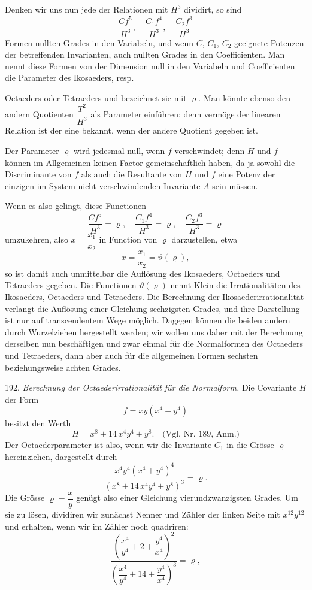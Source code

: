 \documentclass[11pt]{article}
\providecommand{\weberpage}[1]{}
\begin{document}
Denken wir uns nun jede der Relationen mit $H^3$ dividirt, so sind
\[
\frac{Cf^5}{H^3},\quad \frac{C_1f^4}{H^3},\quad \frac{C_2f^3}{H^3}
\]
Formen nullten Grades in den Variabeln, und wenn $C$, $C_1$, $C_2$ geeignete Potenzen der betreffenden Invarianten, auch nullten Grades in den Coefficienten. Man nennt diese Formen von der Dimension null in den Variabeln und Coefficienten die Parameter des Ikosaeders, resp.


\weberpage{214}
Octaeders oder Tetraeders und bezeichnet sie mit $\varrho$. Man könnte ebenso den andern Quotienten $\dfrac{T^2}{H^3}$ als Parameter einführen; denn vermöge der linearen Relation ist der eine bekannt, wenn der andere Quotient gegeben ist.

Der Parameter $\varrho$ wird jedesmal null, wenn $f$ verschwindet; denn $H$ und $f$ können im Allgemeinen keinen Factor gemeinschaftlich haben, da ja sowohl die Discriminante von $f$ als auch die Resultante von $H$ und $f$ eine Potenz der einzigen im System nicht verschwindenden Invariante $A$ sein müssen.

Wenn es also gelingt, diese Functionen
\[
\frac{Cf^5}{H^3}=\varrho,\quad \frac{C_1f^4}{H^3}=\varrho,\quad \frac{C_2f^3}{H^3}=\varrho
\]
umzukehren, also $x=\dfrac{x_1}{x_2}$ in Function von $\varrho$ darzustellen, etwa
\[
x=\frac{x_1}{x_2}=\vartheta(\varrho),
\]
so ist damit auch unmittelbar die Auflösung des Ikosaeders, Octaeders und Tetraeders gegeben. Die Functionen $\vartheta(\varrho)$ nennt Klein die Irrationalitäten des Ikosaeders, Octaeders und Tetraeders. Die Berechnung der Ikosaederirrationalität verlangt die Auflösung einer Gleichung sechzigsten Grades, und ihre Darstellung ist nur auf transcendentem Wege möglich. Dagegen können die beiden andern durch Wurzelziehen hergestellt werden; wir wollen uns daher mit der Berechnung derselben nun beschäftigen und zwar einmal für die Normalformen des Octaeders und Tetraeders, dann aber auch für die allgemeinen Formen sechsten beziehungsweise achten Grades.

192. \textit{Berechnung der Octaederirrationalität für die Normalform.} Die Covariante $H$ der Form
\[
f=xy(x^4+y^4)
\]
besitzt den Werth
\[
H=x^8+14\,x^4y^4+y^8. \quad \text{(Vgl. Nr. 189, Anm.)}
\]
Der Octaederparameter ist also, wenn wir die Invariante $C_1$ in die Grösse $\varrho$ hereinziehen, dargestellt durch
\[
\frac{x^4y^4(x^4+y^4)^4}{(x^8+14\,x^4y^4+y^8)^3}=\varrho.
\]
Die Grösse $\varrho=\dfrac{x}{y}$ genügt also einer Gleichung vierundzwanzigsten Grades. Um sie zu lösen, dividiren wir zunächst Nenner und Zähler der linken Seite mit $x^{12}y^{12}$ und erhalten, wenn wir im Zähler noch quadriren:
\[
\frac{\left(\dfrac{x^4}{y^4}+2+\dfrac{y^4}{x^4}\right)^2}{\left(\dfrac{x^4}{y^4}+14+\dfrac{y^4}{x^4}\right)^3}=\varrho,
\]
\end{document}
